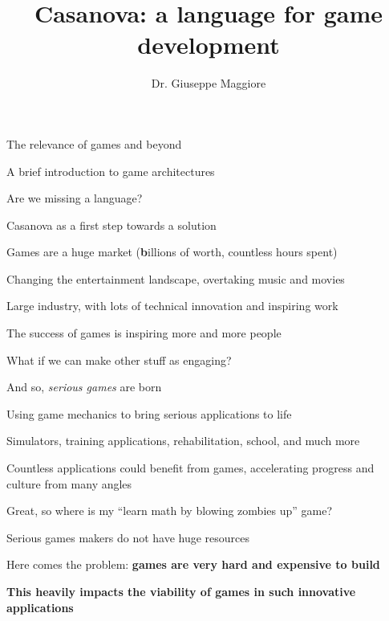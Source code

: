 \documentclass{beamer}
\title{Casanova: a language for game development}
\author{Dr. Giuseppe Maggiore}
\institute{Hogeschool Rotterdam \\ 
Rotterdam, Netherlands}
\date{}
\begin{document}
\maketitle

\begin{slide}{
\item The relevance of games and beyond
\item A brief introduction to game architectures
\item Are we missing a language?
\item Casanova as a first step towards a solution
}\end{slide}

\begin{slide}{
\item Games are a huge market (\textbf{b}illions of worth, countless hours spent)
\item Changing the entertainment landscape, overtaking music and movies
\item Large industry, with lots of technical innovation and inspiring work
}\end{slide}

\begin{slide}{
\item The success of games is inspiring more and more people
\item What if we can make other stuff as engaging?
\item And so, \textit{serious games} are born
}\end{slide}

\begin{slide}{
\item Using game mechanics to bring serious applications to life
\item Simulators, training applications, rehabilitation, school, and much more
\item Countless applications could benefit from games, accelerating progress and culture from many angles
}\end{slide}

\begin{slide}{
\item Great, so where is my ``learn math by blowing zombies up'' game?
\item Serious games makers do not have huge resources
\item Here comes the problem: \textbf{games are very hard and expensive to build}
\pause
\item \textbf{This heavily impacts the viability of games in such innovative applications}
}\end{slide}
\end{document}
